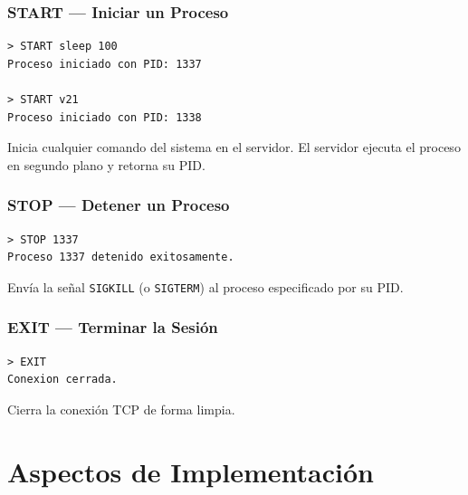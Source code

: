 \documentclass[12pt,a4paper]{report}
\begin{document}
\subsection{START — Iniciar un Proceso}

\begin{tcolorbox}[colback=black!85, colframe=black]
\begin{lstlisting}[style=bashstyle, numbers=none]
> START sleep 100
Proceso iniciado con PID: 1337

> START v21
Proceso iniciado con PID: 1338
\end{lstlisting}
\end{tcolorbox}

Inicia cualquier comando del sistema en el servidor. El servidor ejecuta el proceso en segundo plano y retorna su PID.

\subsection{STOP — Detener un Proceso}

\begin{tcolorbox}[colback=black!85, colframe=black]
\begin{lstlisting}[style=bashstyle, numbers=none]
> STOP 1337
Proceso 1337 detenido exitosamente.
\end{lstlisting}
\end{tcolorbox}

Envía la señal \texttt{SIGKILL} (o \texttt{SIGTERM}) al proceso especificado por su PID.

\subsection{EXIT — Terminar la Sesión}

\begin{tcolorbox}[colback=black!85, colframe=black]
\begin{lstlisting}[style=bashstyle, numbers=none]
> EXIT
Conexion cerrada.
\end{lstlisting}
\end{tcolorbox}

Cierra la conexión TCP de forma limpia.

\chapter{Aspectos de Implementación}
\end{document}

